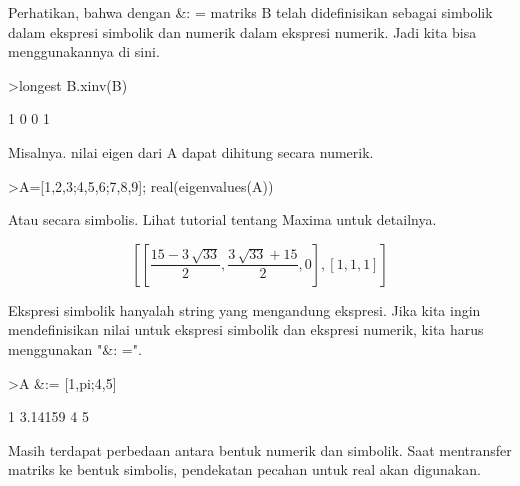 \documentclass[a4paper,10pt]{article}
\begin{document}
\begin{eulernotebook}
\begin{eulercomment}
\begin{eulercomment}
\begin{eulercomment}
\begin{eulercomment}
\begin{eulercomment}
\begin{eulercomment}
\begin{eulercomment}
Perhatikan, bahwa dengan \&: = matriks B telah didefinisikan sebagai
simbolik dalam ekspresi simbolik dan numerik dalam ekspresi numerik.
Jadi kita bisa menggunakannya di sini.
\end{eulercomment}
\begin{eulerprompt}
>longest B.xinv(B)
\end{eulerprompt}
\begin{euleroutput}
                        1                       0 
                        0                       1 
\end{euleroutput}
\begin{eulercomment}
Misalnya. nilai eigen dari A dapat dihitung secara numerik.
\end{eulercomment}
\begin{eulerprompt}
>A=[1,2,3;4,5,6;7,8,9]; real(eigenvalues(A))
\end{eulerprompt}
\begin{euleroutput}
  [16.1168,  -1.11684,  0]
\end{euleroutput}
\begin{eulercomment}
Atau secara simbolis. Lihat tutorial tentang Maxima untuk detailnya.
\end{eulercomment}
\begin{eulerformula}
\[
\left[ \left[ \frac{15-3\,\sqrt{33}}{2} , \frac{3\,\sqrt{33}+15}{2}
  , 0 \right]  , \left[ 1 , 1 , 1 \right]  \right] 
\]
\end{eulerformula}
\begin{eulercomment}
Ekspresi simbolik hanyalah string yang mengandung ekspresi. Jika kita
ingin mendefinisikan nilai untuk ekspresi simbolik dan ekspresi
numerik, kita harus menggunakan "\&: =".
\end{eulercomment}
\begin{eulerprompt}
>A &:= [1,pi;4,5]
\end{eulerprompt}
\begin{euleroutput}
              1       3.14159 
              4             5 
\end{euleroutput}
\begin{eulercomment}
Masih terdapat perbedaan antara bentuk numerik dan simbolik. Saat
mentransfer matriks ke bentuk simbolis, pendekatan pecahan untuk real
akan digunakan.
\end{eulercomment}
\begin{eulerprompt}

\end{eulerprompt}
\end{eulercomment}
\end{eulercomment}
\end{eulercomment}
\end{eulercomment}
\end{eulercomment}
\end{eulercomment}
\end{eulernotebook}
\end{document}
